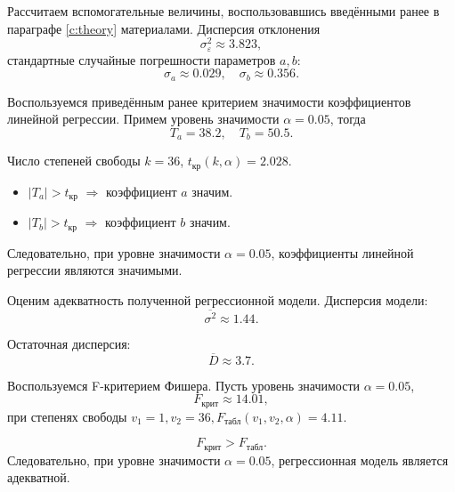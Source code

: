 Рассчитаем вспомогательные величины, воспользовавшись введёнными ранее в параграфе \ref{c:theory} материалами. Дисперсия отклонения
\begin{equation*}
	\sigma_{\varepsilon}^2 \approx 3.823,
\end{equation*}
стандартные случайные погрешности параметров $a, b$:
\begin{equation*}
	\sigma_{a} \approx 0.029, \quad \sigma_{b} \approx 0.356.
\end{equation*}

Воспользуемся приведённым ранее критерием значимости коэффициентов линейной регрессии. Примем уровень значимости $\alpha = 0.05$, тогда
\begin{equation*}
	T_{a} = 38.2, \quad T_{b} = 50.5.
\end{equation*}

Число степеней свободы $k = 36$, $t_{\textrm{кр}}(k, \alpha) = 2.028$.

\begin{itemize}
	\item $\vert T_{a} \vert > t_{\textrm{кр}}$ $\Rightarrow$ коэффициент $a$ значим.
	\item $\vert T_{b} \vert > t_{\textrm{кр}}$ $\Rightarrow$ коэффициент $b$ значим.
\end{itemize}
Следовательно, при уровне значимости $\alpha = 0.05$, коэффициенты линейной регрессии являются значимыми.

Оценим адекватность полученной регрессионной модели. Дисперсия модели:
\begin{equation*}
	\overline{\sigma^2} \approx 1.44.
\end{equation*}

Остаточная дисперсия:
\begin{equation*}
	\overline{D} \approx 3.7.
\end{equation*}

Воспользуемся F-критерием Фишера. Пусть уровень значимости $\alpha = 0.05$,
\begin{equation*}
	F_{\textrm{крит}} \approx 14.01,
\end{equation*}
при степенях свободы $v_1 = 1, v_2 = 36, F_{\textrm{табл}}(v_1, v_2, \alpha) = 4.11$.

\begin{equation*}
	F_{\textrm{крит}} > F_{\textrm{табл}}.
\end{equation*}
Следовательно, при уровне значимости $\alpha = 0.05$, регрессионная модель является адекватной.

